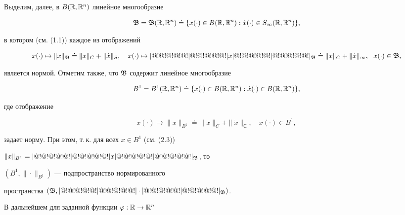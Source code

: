 Выделим, далее, в $B(\Bbb R,\Bbb R^n)$ линейное многообразие


\begin{equation}


\frak B=\frak B(\Bbb R,\Bbb R^n)\doteq


\{x(\cdot)\in B(\Bbb R,\Bbb R^n):\Dot x(\cdot)\in


S_{\infty}(\Bbb R,\Bbb R^n)\},


\end{equation}


в котором (см. (1.1)) каждое из отображений


\begin{equation}


x(\cdot)\mapsto\|x\|_{\frak B}\doteq \|x\|_{C}+\|\Dot x\|_{S},\quad


x(\cdot)\mapsto \tri x\tri_{\frak B}\doteq \|x\|_C+\|\Dot


x\|_{\infty},\ \ x(\cdot)\in\frak B,


\end{equation}


является нормой. Отметим также, что $\frak B$ содержит линейное многообразие


\begin{equation}


B^{1}=B^{1}(\Bbb R,\Bbb R^n)\doteq \{x(\cdot)\in


B(\Bbb R,\Bbb R^n):\Dot


x(\cdot)\in B(\Bbb R,\Bbb R^n)\},


\end{equation}


где отображение


\begin{equation}


x(\cdot)\mapsto\|x\|_{B^1}\doteq \|x\|_C+\|\Dot x\|_С,\quad


x(\cdot) \in B^{1},


\end{equation}


задает норму. При этом, т.\,к. для всех $x\in B^{1}$ (см. (2.3))


$\|x\|_{B^1}=|@!@!@!@!@!|@!@!@!@!@!| x|@!@!@!@!@!|@!@!@!@!@!|_{\frak B}$, то


$(B^{1},\|\cdot\|_{B^1})$ --- подпространство нормированного


пространства $(\frak B,|@!@!@!@!@!|@!@!@!@!@!|\cdot|@!@!@!@!@!|@!@!@!@!@!|_{\frak B})$.





В дальнейшем для заданной функции $\varphi:\Bbb R\to\Bbb R^n$


